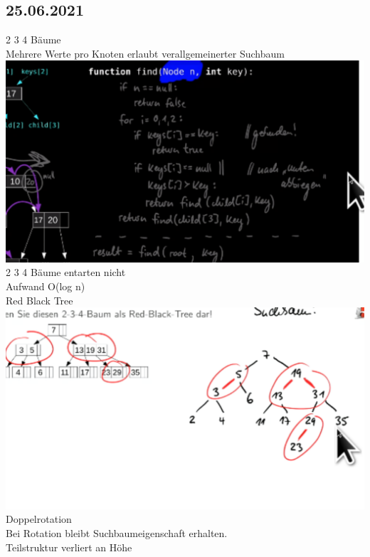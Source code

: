 \documentclass{article}
\begin{document}
 	\subsection*{25.06.2021}
 	2 3 4 Bäume  \\
 	Mehrere Werte pro Knoten erlaubt verallgemeinerter Suchbaum \\
 	\includegraphics[width=\linewidth]{find} \\
 	2 3 4 Bäume entarten nicht \\
 	Aufwand O(log n) \\
 	Red Black Tree \\
 	\includegraphics[width=\linewidth]{rbt} \\
	Doppelrotation \\
	Bei Rotation bleibt Suchbaumeigenschaft erhalten. \\
	Teilstruktur verliert an Höhe \\
\end{document}
